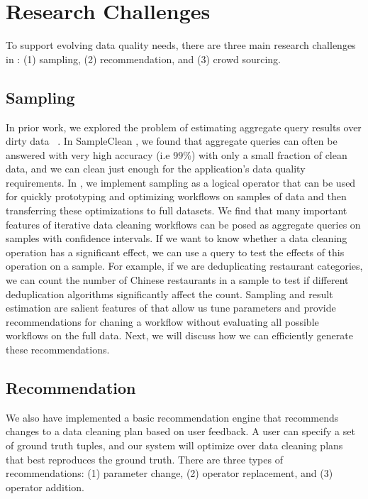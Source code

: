 \section{Research Challenges}
To support evolving data quality needs, there are three main research challenges in \sys: (1) sampling, (2) recommendation, and (3) crowd sourcing.

\subsection{Sampling}
In prior work, we explored the problem of estimating aggregate query results over dirty data ~\cite{wang1999sample}.
In SampleClean \cite{wang1999sample}, we found that aggregate queries can often be answered with very high accuracy (i.e 99\%) with only a small fraction of clean data, and we can clean just enough for the application's data quality requirements.
In \sys, we implement sampling as a logical operator that can be used for quickly prototyping and optimizing workflows on samples of data and then transferring these optimizations to full datasets.
We find that many important features of iterative data cleaning workflows can be posed as aggregate queries on samples with confidence intervals.
If we want to know whether a data cleaning operation has a significant effect, we can use a query to test the effects of this operation on a sample.
For example, if we are deduplicating restaurant categories, we can count the number of Chinese restaurants in a sample to test if different deduplication algorithms significantly affect the count.
Sampling and result estimation are salient features of \sys that allow us tune parameters and provide recommendations for chaning a workflow without evaluating all possible workflows on the full data.
Next, we will discuss how we can efficiently generate these recommendations.

\subsection{Recommendation}
We also have implemented a basic recommendation engine that recommends changes to a data cleaning plan based on user feedback. 
A user can specify a set of ground truth tuples, and our system will optimize over data cleaning plans that best reproduces the ground truth.
There are three types of recommendations: (1) parameter change, (2) operator replacement, and (3) operator addition.

\vspace{.5em}

